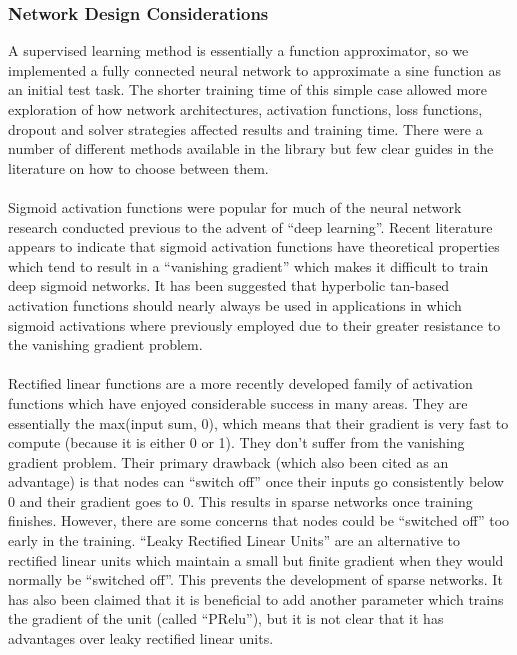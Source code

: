 \documentclass[12pt]{article}
\begin{document}
\subsubsection{Network Design Considerations}
	A supervised learning method is essentially a function approximator, so we implemented a fully connected neural network to approximate a sine function as an initial test task.  The shorter training time of this simple case allowed more exploration of how network architectures, activation functions, loss functions, dropout and solver strategies affected results and training time.  There were a number of different methods available in the library but few clear guides in the literature on how to choose between them.\\
\\
	Sigmoid activation functions were popular for much of the neural network research conducted previous to the advent of “deep learning”.  Recent literature appears to indicate that sigmoid activation functions have theoretical properties which tend to result in a “vanishing gradient” which makes it difficult to train deep sigmoid networks.  It has been suggested that hyperbolic tan-based activation functions should nearly always be used in applications in which sigmoid activations where previously employed due to their greater resistance to the vanishing gradient problem.\\
\\  
	Rectified linear functions are a more recently developed family of activation functions which have enjoyed considerable success in many areas.  They are essentially the max(input sum, 0), which means that their gradient is very fast to compute (because it is either 0 or 1).  They don't suffer from the vanishing gradient problem.  Their primary drawback (which also been cited as an advantage) is that nodes can “switch off” once their inputs go consistently below 0 and their gradient goes to 0.  This results in sparse networks once training finishes. However, there are some concerns that nodes could be “switched off” too early in the training.  “Leaky Rectified Linear Units” are an alternative to rectified linear units which maintain a small but finite gradient when they would normally be “switched off”.  This prevents the development of sparse networks.  It has also been claimed that it is beneficial to add another parameter which trains the gradient of the unit (called “PRelu”), but it is not clear that it has advantages over leaky rectified linear units.\\
\\
\end{document}
